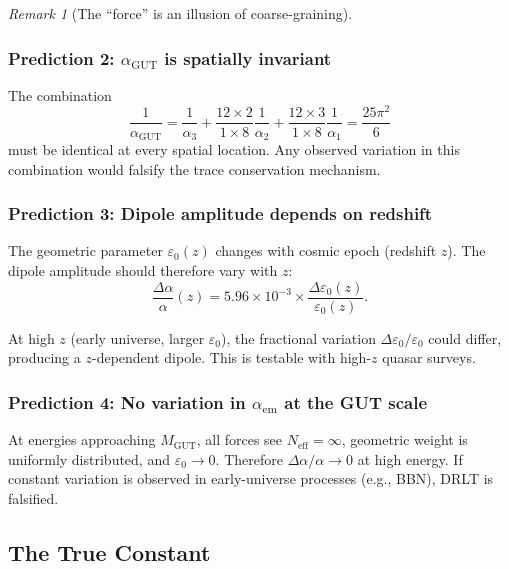 \documentclass[12pt]{article}
\theoremstyle{remark}
\newtheorem{remark}[theorem]{Remark}
\theoremstyle{definition}
\newcommand{\agut}{\alpha_{\mathrm{GUT}}}
\begin{document}
\begin{remark}[The ``force'' is an illusion of coarse-graining]
\subsubsection{Prediction 2: $\agut$ is spatially invariant}

The combination
\begin{equation}
\frac{1}{\agut} = \frac{1}{\alpha_3} + \frac{12 \times 2}{1 \times 8}\frac{1}{\alpha_2} + \frac{12 \times 3}{1 \times 8}\frac{1}{\alpha_1} = \frac{25\pi^2}{6}
\end{equation}
must be identical at every spatial location. Any observed variation in this combination would falsify the trace conservation mechanism.

\subsubsection{Prediction 3: Dipole amplitude depends on redshift}

The geometric parameter $\varepsilon_0(z)$ changes with cosmic epoch (redshift $z$). The dipole amplitude should therefore vary with $z$:
\begin{equation}
\frac{\Delta\alpha}{\alpha}(z) = 5.96 \times 10^{-3} \times \frac{\Delta\varepsilon_0(z)}{\varepsilon_0(z)}.
\end{equation}

At high $z$ (early universe, larger $\varepsilon_0$), the fractional variation $\Delta\varepsilon_0/\varepsilon_0$ could differ, producing a $z$-dependent dipole. This is testable with high-$z$ quasar surveys.

\subsubsection{Prediction 4: No variation in $\alpha_\text{em}$ at the GUT scale}

At energies approaching $M_\text{GUT}$, all forces see $N_\text{eff} = \infty$, geometric weight is uniformly distributed, and $\varepsilon_0 \to 0$. Therefore $\Delta\alpha/\alpha \to 0$ at high energy. If constant variation is observed in early-universe processes (e.g., BBN), DRLT is falsified.

\subsection{The True Constant}


\end{remark}
\end{document}
